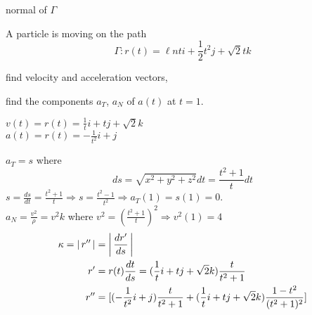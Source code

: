 \documentclass[11pt]{amsbook}
\begin{document}
normal of $\Gamma$ 
    \begin{exmp}
    A particle is moving on the path
    \[
    \Gamma : r(t) = \ell n t i + \frac{1}{2} t^2 j + \sqrt{2} t k
    \]
    \begin{hEnumerateAlpha}
	\item
	find velocity and acceleration vectors, 
	\item
	find the components $a_T$, $a_N$ of $a(t)$ at $t=1$.
	\end{hEnumerateAlpha}
	\begin{hSolution}
    	\begin{hEnumerateAlpha}
    	\item
    	$v(t) = r(t) = \frac{1}{t}i + tj + \sqrt{2}k$ \\
    	$a(t) = r(t) = -\frac{1}{t^2}i + j$
    	\item
    	$a_T = s$ where
    	\[
    	ds = \sqrt{x^2+y^2+z^2} dt = \frac{t^2+1}{t}dt
    	\]
    	$s = 
    	    \frac
    	        {ds}
    	        {dt} 
    	        = \frac
    	            {t^2+1}
    	            {t} 
    	            \Rightarrow s = 
    	            \frac{t^2-1}{t^2} 
    	            \Rightarrow a_T(1) = s(1) = 0$.\\
    	$a_N = 
    	\frac
    	    {v^2}
    	    {\rho} 
    	    = v^2k$  where  $  v^2 = 
    	    (\frac
    	        {t^2+1}
    	        {t})^2 
    	        \Rightarrow v^2(1) = 4$
    	\begin{align*}
            \kappa = 
            \hAbs{r''} 
            &= \hAbs{
                    \frac
                    {dr'}
                    {ds}} \\
        r' &= r(t)
            \frac
                {dt}
                {ds} = (\frac
                         {1}
                         {t}i + tj + 
                         \sqrt
                         {2}k)
                            \frac
                            {t}
                            {t^2+1} \\
        r'' &= 
            [(-\frac
                {1}
                {t^2}i+j)
                    \frac
                    {t}
                    {t^2+1} + (\frac
                                {1}
                                {t}i + tj + 
                                \sqrt
                                {2}k)
                                    \frac
                                    {1-t^2}
                                    {(t^2+1)^2}] 

\end{align*}
\end{hEnumerateAlpha}
\end{hSolution}
\end{exmp}
\end{document}

